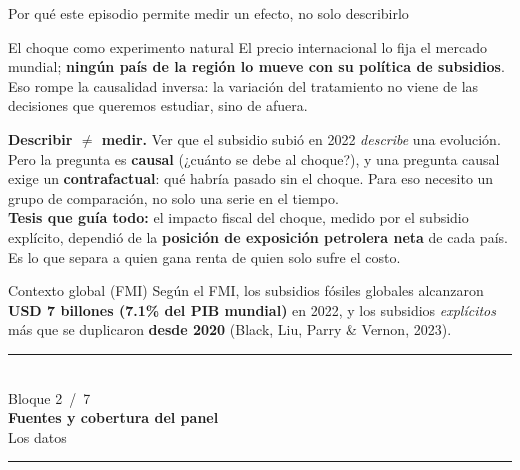 \documentclass[aspectratio=169,10pt]{beamer}
\newcommand{\key}[1]{{\bfseries\color{AcentoRojo}#1}}
\newcommand{\divisor}[3]{%
  {\setbeamertemplate{footline}{}%
   \begin{frame}[plain]
     \vfill
     \begin{center}
       {\color{AcentoRojo}\rule{2.6cm}{1.2pt}}\\[0.7em]
       {\scriptsize\color{GrisMedio}Bloque #1 \,/\, 7}\\[0.6em]
       {\Large\color{Carbon}\bfseries #2}\\[0.45em]
       {\color{GrisMedio}#3}\\[0.7em]
       {\color{AcentoRojo}\rule{2.6cm}{1.2pt}}
     \end{center}
     \vfill
   \end{frame}}}
\begin{document}
\begin{frame}{Por qué este episodio permite medir un efecto, no solo describirlo}
  \small
  \begin{block}{El choque como experimento natural}
    El precio internacional lo fija el mercado mundial; \textbf{ningún país de la región lo mueve
    con su política de subsidios}. Eso \alert{rompe la causalidad inversa}: la variación del
    tratamiento no viene de las decisiones que queremos estudiar, sino de afuera.
  \end{block}

  \textbf{Describir $\neq$ medir.} Ver que el subsidio subió en 2022 \emph{describe} una
  evolución. Pero la pregunta es \textbf{causal} (¿cuánto se debe al choque?), y una pregunta
  causal exige un \textbf{contrafactual}: qué habría pasado sin el choque. Para eso necesito un
  grupo de comparación, no solo una serie en el tiempo.\\[0.3em]
  \textbf{Tesis que guía todo:} el impacto fiscal del choque, medido por el subsidio explícito,
  dependió de la \key{posición de exposición petrolera neta} de cada país. Es lo que separa a quien
  gana renta de quien solo sufre el costo.

  \begin{block}{Contexto global (FMI)}
    {\footnotesize Según el FMI, los subsidios fósiles globales alcanzaron \textbf{USD 7 billones
    (7.1\% del PIB mundial)} en 2022, y los subsidios \emph{explícitos} más que se duplicaron
    \textbf{desde 2020} (Black, Liu, Parry \& Vernon, 2023).}
  \end{block}

\end{frame}

\divisor{2}{Fuentes y cobertura del panel}{Los datos}
\end{document}
